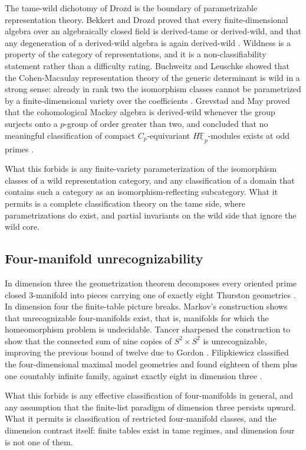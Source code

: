 \documentclass[11pt,letterpaper]{article}
\theoremstyle{definition}
\theoremstyle{remark}
\begin{document}
The tame-wild dichotomy of Drozd is the boundary of parametrizable representation theory. Bekkert and Drozd proved that every finite-dimensional algebra over an algebraically closed field is derived-tame or derived-wild, and that any degeneration of a derived-wild algebra is again derived-wild \cite{bekkert2003}. Wildness is a property of the category of representations, and it is a non-classifiability statement rather than a difficulty rating. Buchweitz and Leuschke showed that the Cohen-Macaulay representation theory of the generic determinant is wild in a strong sense: already in rank two the isomorphism classes cannot be parametrized by a finite-dimensional variety over the coefficients \cite{buchweitz2005}. Grevstad and May proved that the cohomological Mackey algebra is derived-wild whenever the group surjects onto a $p$-group of order greater than two, and concluded that no meaningful classification of compact $C_p$-equivariant $H\underline{\mathbb{F}}_p$-modules exists at odd primes \cite{grevstad2025}.

What this forbids is any finite-variety parameterization of the isomorphism classes of a wild representation category, and any classification of a domain that contains such a category as an isomorphism-reflecting subcategory. What it permits is a complete classification theory on the tame side, where parametrizations do exist, and partial invariants on the wild side that ignore the wild core.

\subsection{Four-manifold unrecognizability}

In dimension three the geometrization theorem decomposes every oriented prime closed 3-manifold into pieces carrying one of exactly eight Thurston geometries \cite{geometrization}. In dimension four the finite-table picture breaks. Markov's construction shows that unrecognizable four-manifolds exist, that is, manifolds for which the homeomorphism problem is undecidable. Tancer sharpened the construction to show that the connected sum of nine copies of $S^2 \times S^2$ is unrecognizable, improving the previous bound of twelve due to Gordon \cite{tancer2023}. Filipkiewicz classified the four-dimensional maximal model geometries and found eighteen of them plus one countably infinite family, against exactly eight in dimension three \cite{geometrization,perelman,hillman}.

What this forbids is any effective classification of four-manifolds in general, and any assumption that the finite-list paradigm of dimension three persists upward. What it permits is classification of restricted four-manifold classes, and the dimension contrast itself: finite tables exist in tame regimes, and dimension four is not one of them.
\end{document}
